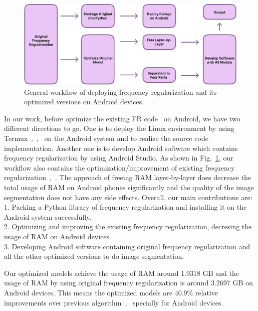 \documentclass[runningheads]{llncs}
\begin{document}
\begin{figure}[htbp]
	\centering
	\label{image:workflow}
	\includegraphics[width=1\linewidth]{figures/workflow.jpg}
	\caption{General workflow of deploying frequency regularization and its optimized versions on Android devices.}
\end{figure}

In our work, before optimize the existing FR code~\cite{fr_repo} on Android, we have two different directions to go. One is to deploy the Linux environment by using Termux~\cite{termux_repo},~\cite{termux_overview},~\cite{termux_wiki} on the Android system and to realize the source code implementation. Another one is to develop Android software which contains frequency regularization by using Android Studio. As shown in Fig.~\ref{image:workflow}, our workflow also contains the optimization/improvement of existing frequency regularization~\cite{zhao2023fr},~\cite{fr_repo}. The approach of freeing RAM layer-by-layer does decrease the total usage of RAM on Android phones significantly and the quality of the image segmentation does not have any side effects. Overall, our main contributions are:\\
1. Packing a Python library of frequency regularization and installing it on the Android system successfully.\\
2. Optimizing and improving the existing frequency regularization, decresing the usage of RAM on Android devices.\\
3. Developing Android software containing original frequency regularization and all the other optimized versions to do image segmentation.

Our optimized models achieve the usage of RAM around 1.9318 GB and the usage of RAM by using original frequency regularization is around 3.2697 GB on Android devices. This means the optimized models are  40.9\% relative improvements over previous algorithm~\cite{zhao2023fr},~\cite{fr_repo} specially for Android devices.
\end{document}
